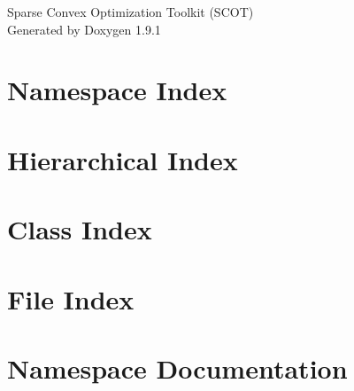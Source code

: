 \let\mypdfximage\pdfximage\def\pdfximage{\immediate\mypdfximage}\documentclass[twoside]{book}
\newcommand{\+}{\discretionary{\mbox{\scriptsize$\hookleftarrow$}}{}{}}
\newcommand{\clearemptydoublepage}{%
  \newpage{\pagestyle{empty}\cleardoublepage}%
}
\begin{document}
\raggedbottom

\hypersetup{pageanchor=false,
             bookmarksnumbered=true,
             pdfencoding=unicode
            }
\begin{titlepage}
\vspace*{7cm}
\begin{center}%
{\Large Sparse Convex Optimization Toolkit (SCOT) }\\
\vspace*{1cm}
{\large Generated by Doxygen 1.9.1}\\
\end{center}
\end{titlepage}
\clearemptydoublepage
{}
\tableofcontents
\clearemptydoublepage
{}
\hypersetup{pageanchor=true}

\chapter{Namespace Index}

\chapter{Hierarchical Index}

\chapter{Class Index}

\chapter{File Index}

\chapter{Namespace Documentation}




\end{document}

